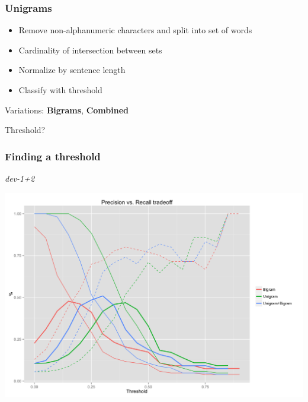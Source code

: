 \documentclass[table]{beamer}
\begin{document}
\begin{frame}
  \frametitle{\textbf{Unigrams}}
  \begin{center}
  \end{center}\pause

  \begin{itemize}
    \item Remove non-alphanumeric characters and split into set of words\pause
    \item Cardinality of intersection between sets\pause
    \item Normalize by sentence length\pause
    \item Classify with threshold\pause
  \end{itemize}

  Variations: \textbf{Bigrams}, \textbf{Combined}

  \vspace{0.5cm}
  Threshold?
\end{frame}

\begin{frame}
  \frametitle{Finding a threshold}
  \center\textit{dev-1+2}

  \quad\includegraphics[scale=0.09]{a.png}
\end{frame}
\end{document}
